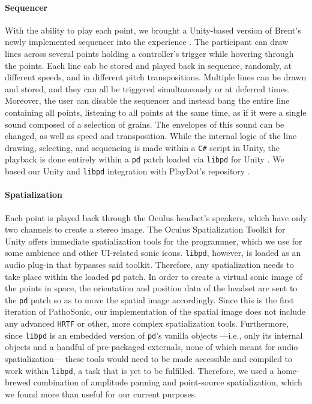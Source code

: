 \documentclass{nime-alternate}
\begin{document}
\paragraph{Sequencer}
With the ability to play each point, we brought a Unity-based version of Brent's newly implemented sequencer into the experience \cite{wbrent2019}. The participant can draw lines across several points holding a controller's trigger while hovering through the points. Each line cab be stored and played back in sequence, randomly, at different speeds, and in different pitch transpositions. Multiple lines can be drawn and stored, and they can all be triggered simultaneously or at deferred times. Moreover, the user can disable the sequencer and instead bang the entire line containing all points, listening to all points at the same time, as if it were a single sound composed of a selection of grains. The envelopes of this sound can be changed, as well as speed and transposition. While the internal logic of the line drawing, selecting, and sequencing is made within a \texttt{C\#} script in Unity, the playback is done entirely within a \texttt{pd} patch loaded via \texttt{libpd} for Unity \cite{libpd2019}. We based our Unity and \texttt{libpd} integration with PlayDot's repository \cite{playdots2019}.

\paragraph{Spatialization}
Each point is played back through the Oculus headset's speakers, which have only two channels to create a stereo image. The Oculus Spatialization Toolkit for Unity offers immediate spatialization tools for the programmer, which we use for some ambience and other UI-related sonic icons. \texttt{libpd}, however, is loaded as an audio plug-in that bypasses said toolkit. Therefore, any spatialization needs to take place within the loaded \texttt{pd} patch. In order to create a virtual sonic image of the points in space, the orientation and position data of the headset are sent to the \texttt{pd} patch so as to move the spatial image accordingly. Since this is the first iteration of PathoSonic, our implementation of the spatial image does not include any advanced \texttt{HRTF} or other, more complex spatialization tools. Furthermore, since \texttt{libpd} is an embedded version of \texttt{pd}'s vanilla objects ---i.e., only its internal objects and a handful of pre-packaged externals, none of which meant for audio spatialization--- these tools would need to be made accessible and compiled to work within \texttt{libpd}, a task that is yet to be fulfilled. Therefore, we used a home-brewed combination of amplitude panning and point-source spatialization, which we found more than useful for our current purposes.
\end{document}
